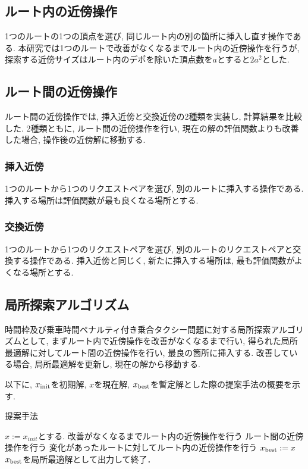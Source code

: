 \subsection{ルート内の近傍操作}
1つのルートの1つの頂点を選び, 同じルート内の別の箇所に挿入し直す操作である. 本研究では1つのルートで改善がなくなるまでルート内の近傍操作を行うが, 探索する近傍サイズはルート内のデポを除いた頂点数を$a$とすると$2a^2$とした.

\subsection{ルート間の近傍操作}
ルート間の近傍操作では, 挿入近傍と交換近傍の2種類を実装し, 計算結果を比較した. 2種類ともに, ルート間の近傍操作を行い, 現在の解の評価関数よりも改善した場合, 操作後の近傍解に移動する.
\subsubsection{挿入近傍}
1つのルートから1つのリクエストペアを選び, 別のルートに挿入する操作である. 挿入する場所は評価関数が最も良くなる場所とする.
\subsubsection{交換近傍}
1つのルートから1つのリクエストペアを選び, 別のルートのリクエストペアと交換する操作である. 挿入近傍と同じく, 新たに挿入する場所は, 最も評価関数がよくなる場所とする.
\subsection{局所探索アルゴリズム}
時間枠及び乗車時間ペナルティ付き乗合タクシー問題に対する局所探索アルゴリズムとして, まずルート内で近傍操作を改善がなくなるまで行い, 得られた局所最適解に対してルート間の近傍操作を行い, 最良の箇所に挿入する. 改善している場合, 局所最適解を更新し, 現在の解から移動する.

以下に, $x_{\rm init}$を初期解, $x$を現在解, $x_{\rm best}$を暫定解とした際の提案手法の概要を示す.
\begin{algorithm}
 \caption{提案手法}
 \label{algo1}
 \begin{algorithmic}[1]%
  \STATE $x := x_{init}$とする.
  \STATE 改善がなくなるまでルート内の近傍操作を行う
  \STATE ルート間の近傍操作を行う
  \STATE 変化があったルートに対してルート内の近傍操作を行う
  \STATE  $x_{\rm best} := x$
  \ENDIF
  \STATE $x_{\rm best}$を局所最適解として出力して終了．
 \end{algorithmic}
\end{algorithm}
